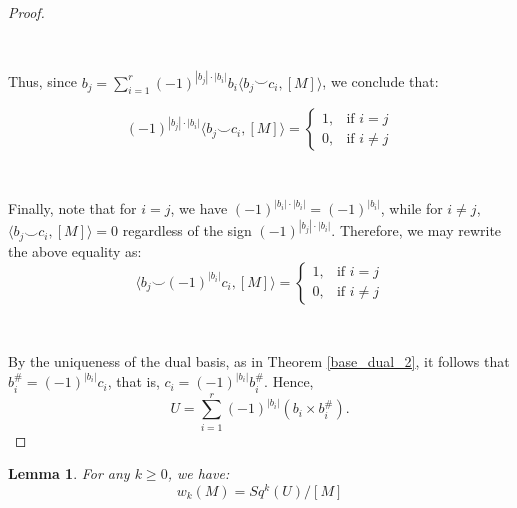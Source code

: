 \documentclass[12pt,oneside]{book}
\newtheorem{lem}    {Lemma}[chapter]
\newcommand{\ds}{\displaystyle}
\newcommand{\ccup}{\smile}
\begin{document}
\begin{proof}
        \

        \

        Thus, since $b_{j} = \ds\sum_{i=1}^{r} (-1)^{|b_{j}| \cdot |b_{i}|} b_{i} \langle b_{j} \ccup c_{i}, [M] \rangle$, we conclude that:
        
        \[
        (-1)^{|b_{j}| \cdot |b_{i}|} \langle b_{j} \ccup c_{i}, [M] \rangle =
        \begin{cases}
        	1, & \text{if } i = j \\
        	0, & \text{if } i \neq j
        \end{cases}
        \]

        \

        Finally, note that for $i = j$, we have $(-1)^{|b_{i}| \cdot |b_{i}|} = (-1)^{|b_{i}|}$, while for 
        $i \neq j$, $\langle b_{j} \ccup c_{i}, [M] \rangle = 0$ regardless of the sign $(-1)^{|b_{j}| \cdot |b_{i}|}$. Therefore, we may 
        rewrite the above equality as:
        \[
        \langle b_{j} \ccup (-1)^{|b_{i}|} c_{i}, [M] \rangle =
        \begin{cases}
        	1, & \text{if } i = j \\
        	0, & \text{if } i \neq j
        \end{cases}
        \]

        \

        By the uniqueness of the dual basis, as in Theorem \ref{base_dual_2}, it follows that 
        $b_{i}^{\#} = (-1)^{|b_{i}|} c_{i}$, that is, $c_{i} = (-1)^{|b_{i}|} b_{i}^{\#}$. Hence,
        \[
        U = \ds\sum_{i=1}^{r} (-1)^{|b_{i}|} \left( b_{i} \times b_{i}^{\#} \right).
        \]

    \end{proof}

    \begin{lem}\label{lema_tecnico_wu}
	For any $k \geq 0$, we have:
	$$ w_{k}(M) = Sq^{k}(U)/[M] $$
    \end{lem}
\end{document}
